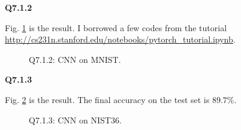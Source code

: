 \documentclass[
  course = {{16-720B Computer Vision}},
  quartile = {{1}},
  assignment = 3-Neural\ Networks\ for\ Recognition,
  name = {{Kangle Deng}},
  email = {{kangled@andrew.cmu.edu}},
  firstexercise = 1
]{aga-homework}
\begin{document}
\noindent \textbf{Q7.1.2}

Fig. \ref{fig:cv_hw3_q712} is the result. I borrowed a few codes from the tutorial \url{http://cs231n.stanford.edu/notebooks/pytorch_tutorial.ipynb}.
\begin{figure}
    \centering
    \caption{Q7.1.2: CNN on MNIST.}
    \label{fig:cv_hw3_q712}
\end{figure}

\noindent \textbf{Q7.1.3}

Fig. \ref{fig:cv_hw3_q713} is the result. The final accuracy on the test set is $89.7\%$.

\begin{figure}
    \centering
    \caption{Q7.1.3: CNN on NIST36.}
    \label{fig:cv_hw3_q713}
\end{figure}
\end{document}
